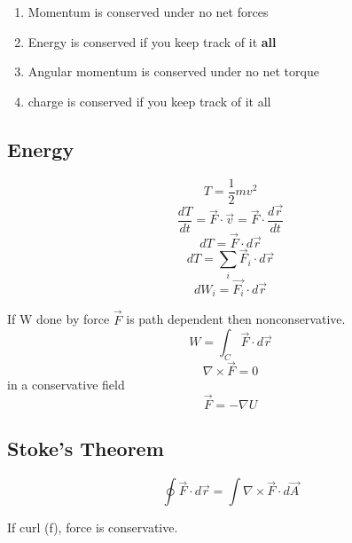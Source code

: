 \begin{enumerate}
	\item Momentum is conserved under no net forces
	\item Energy is conserved if you keep track of it \textbf{all}
	\item Angular momentum is conserved under no net torque
	\item charge is conserved if you keep track of it all
\end{enumerate}

\subsection{Energy}
\begin{equation}
	\label{kenergy}
	T=\frac{1}{2}mv^{2}
\end{equation}
\begin{equation}
	\label{}
	\frac{dT}{dt}=\vec{F}\cdot\vec{v}=\vec{F}\cdot\frac{d\vec{r}}{dt}
\end{equation}
\begin{equation}
	\label{}
	dT=\vec{F}\cdot d\vec{r}
\end{equation}
\begin{equation}
	\label{}
	dT=\sum_{i}\vec{F}_{i}\cdot d\vec{r}	
\end{equation}
\begin{equation}
	\label{}
	dW_{i}=\vec{F_{i}}\cdot d\vec{r}
\end{equation}

If W done by force $\vec{F}$ is path dependent then nonconservative.
\begin{equation}
	\label{}
	W=\int_{C}\vec{F}\cdot d\vec{r}
\end{equation}
\begin{equation}
	\label{}
	\nabla \times \vec{F} =0
\end{equation}
in a conservative field
\begin{equation}
	\label{}
	\vec{F}=-\nabla U
\end{equation}

\subsection{Stoke's Theorem}
\begin{equation}
	\label{}
	\oint\vec{F}\cdot d\vec{r}=\int\nabla \times \vec{F}\cdot d\vec{A}
\end{equation}

If curl (f), force is conservative.

